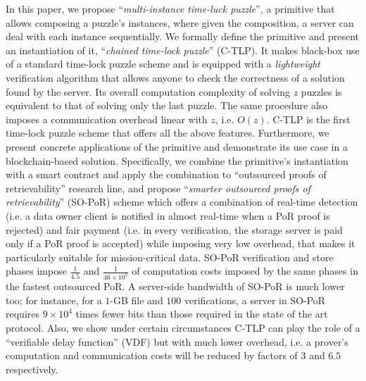 In this paper, we propose  ``\emph{multi-instance time-luck puzzle}'', a primitive that allows composing a puzzle's instances, where given the composition, a server can deal with each instance sequentially. We formally define the primitive and  present an instantiation of it,  ``\emph{chained  time-lock puzzle}'' (C-TLP).  It makes black-box use of a standard time-lock puzzle scheme and is equipped  with a  \emph{lightweight} verification algorithm that allows anyone to check the correctness of a solution found by the server.    Its overall computation complexity of solving $z$ puzzles is  equivalent to that of solving only the last puzzle. The same procedure also imposes a  communication overhead linear with $z$, i.e. $O(z)$. C-TLP is the first time-lock puzzle scheme that offers all  the above features. Furthermore, we present  concrete applications of the primitive and demonstrate its use case in a blockchain-based solution. Specifically, we combine  the primitive's instantiation with a smart contract and apply the combination  to  ``outsourced proofs of  retrievability'' research line, and   propose ``\emph{smarter  outsourced proofs of retrievability}'' (SO-PoR) scheme which offers  a  combination of real-time detection (i.e. a data owner client is notified in almost real-time when a PoR proof is rejected) and fair payment (i.e. in every verification, the storage server is paid only if a PoR proof  is accepted) while  imposing very low overhead, that makes it particularly suitable for mission-critical data. SO-PoR verification and store phases impose $\frac{1}{4.5}$  and $\frac{1}{46\times 10^{\scriptscriptstyle 5}}$ of computation costs  imposed by the same phases in the fastest outsourced PoR. A server-side bandwidth of SO-PoR is much lower too;  for instance, for a $1$-GB file and $100$ verifications, a server in SO-PoR requires $9\times 10^{\scriptscriptstyle4}$ times fewer bits  than those required in the state of the art protocol.  Also, we show under certain circumstances  C-TLP can play the role of a ``verifiable delay function'' (VDF) but with much lower overhead, i.e. a prover's computation and communication costs will be reduced by factors of  $3$ and $6.5$ respectively.


